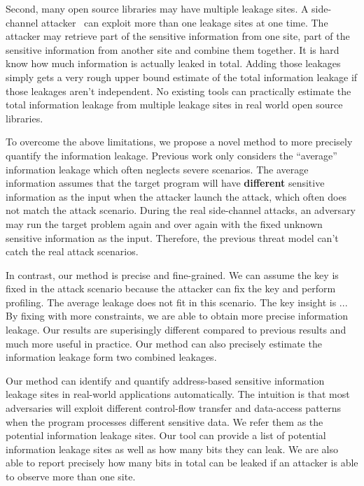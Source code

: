 Second, many open source libraries may have multiple leakage sites. 
A side-channel attacker~\cite{191010,7163052,hornby2011side} can exploit more than one leakage 
sites at one time. 
The attacker may retrieve part of the sensitive information from one site, part of the sensitive
information from another site and combine them together.
It is hard know how much information is actually leaked in total. Adding those leakages 
simply gets a very rough upper bound estimate of the total information leakage if those 
leakages aren’t independent. No existing tools can practically estimate the total information 
leakage from multiple leakage sites in real world open source libraries.

To overcome the above limitations, we propose a novel method
to more precisely quantify the information leakage. Previous work only considers the
``average'' information leakage which often neglects severe scenarios.
The average information assumes that the target program will have \textbf{different} sensitive 
information as the input when the attacker launch the attack,
which often does not match the attack scenario. During the real side-channel
attacks, an adversary may run the target problem again and over again with the 
fixed unknown sensitive information as the input. Therefore, the previous
threat model can't catch the real attack scenarios.

In contrast, our method is precise and fine-grained. 
We can assume the key is fixed
in the attack scenario because the attacker can fix the key and perform profiling.
The average leakage does not fit in this scenario.
The key insight is ...  
By fixing with more constraints, we are able to obtain more precise information leakage.
Our results are superisingly different compared to previous results
and much more useful in practice.
Our method can also precisely estimate the information leakage form two combined leakages. 

Our method can identify and quantify address-based
sensitive information leakage sites in real-world applications automatically. 
The intuition is that most
adversaries will exploit different control-flow transfer and data-access patterns when 
the program processes different sensitive data. We refer them as the potential information
leakage sites. Our tool can provide a list of potential information leakage sites as well as how many 
bits they can leak. We are also able to report precisely how many bits in total
can be leaked if an attacker is able to observe more than one site.

